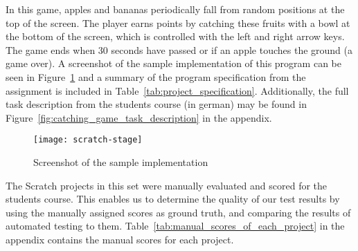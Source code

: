In this game, apples and bananas periodically fall from random positions at the top of the screen.
The player earns points by catching these fruits with a bowl at the bottom of the screen,
which is controlled with the left and right arrow keys.
The game ends when 30 seconds have passed or if an apple touches the ground (a game over).
A screenshot of the sample implementation of this program can be seen in Figure~\ref{fig:screenshot_of_the_sample_implementation}
and a summary of the program specification from the assignment is included in Table~\ref{tab:project_specification}.
Additionally, the full task description from the students course (in german) may be found in Figure~\ref{fig:catching_game_task_description} in the appendix.
\parspace

\begin{figure}[htpb]
    \centering
    \texttt{[image: scratch-stage]}
    \caption{Screenshot of the sample implementation}
    \label{fig:screenshot_of_the_sample_implementation}
\end{figure}

The Scratch projects in this set were manually evaluated and scored for the students course.
This enables us to determine the quality of our test results by using the manually assigned scores as ground truth,
and comparing the results of automated testing to them.
Table~\ref{tab:manual_scores_of_each_project} in the appendix contains the manual scores for each project.
\parspace

